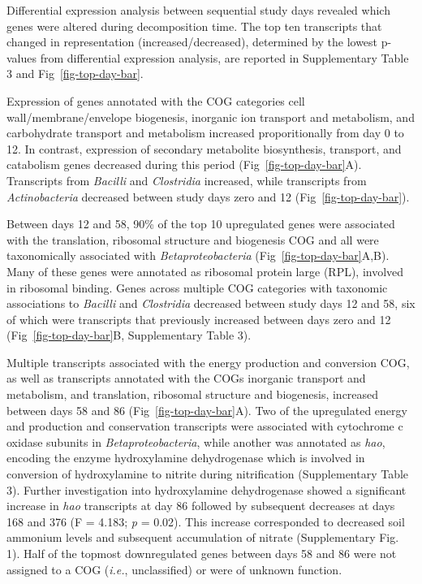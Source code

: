 \documentclass[
  sn-nature,
  lineno, referee]{sn-jnl}
\begin{document}
Differential expression analysis between sequential study days revealed
which genes were altered during decomposition time. The top ten
transcripts that changed in representation (increased/decreased),
determined by the lowest p-values from differential expression analysis,
are reported in Supplementary Table 3 and Fig~\ref{fig-top-day-bar}.

Expression of genes annotated with the COG categories cell
wall/membrane/envelope biogenesis, inorganic ion transport and
metabolism, and carbohydrate transport and metabolism increased
proporitionally from day 0 to 12. In contrast, expression of secondary
metabolite biosynthesis, transport, and catabolism genes decreased
during this period (Fig~\ref{fig-top-day-bar}A). Transcripts from
\emph{Bacilli} and \emph{Clostridia} increased, while transcripts from
\emph{Actinobacteria} decreased between study days zero and 12
(Fig~\ref{fig-top-day-bar}).

Between days 12 and 58, 90\% of the top 10 upregulated genes were
associated with the translation, ribosomal structure and biogenesis COG
and all were taxonomically associated with \emph{Betaproteobacteria}
(Fig~\ref{fig-top-day-bar}A,B). Many of these genes were annotated as
ribosomal protein large (RPL), involved in ribosomal binding. Genes
across multiple COG categories with taxonomic associations to
\emph{Bacilli} and \emph{Clostridia} decreased between study days 12 and
58, six of which were transcripts that previously increased between days
zero and 12 (Fig~\ref{fig-top-day-bar}B, Supplementary Table 3).

Multiple transcripts associated with the energy production and
conversion COG, as well as transcripts annotated with the COGs inorganic
transport and metabolism, and translation, ribosomal structure and
biogenesis, increased between days 58 and 86
(Fig~\ref{fig-top-day-bar}A). Two of the upregulated energy and
production and conservation transcripts were associated with cytochrome
c oxidase subunits in \emph{Betaproteobacteria}, while another was
annotated as \emph{hao}, encoding the enzyme hydroxylamine dehydrogenase
which is involved in conversion of hydroxylamine to nitrite during
nitrification (Supplementary Table 3). Further investigation into
hydroxylamine dehydrogenase showed a significant increase in \emph{hao}
transcripts at day 86 followed by subsequent decreases at days 168 and
376 (F = 4.183; \emph{p} = 0.02). This increase corresponded to
decreased soil ammonium levels and subsequent accumulation of nitrate
(Supplementary Fig. 1). Half of the topmost downregulated genes between
days 58 and 86 were not assigned to a COG (\emph{i.e.}, unclassified) or
were of unknown function.
\end{document}
